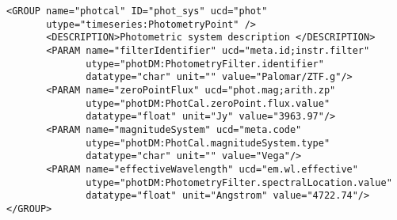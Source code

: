 \noindent
\begingroup\footnotesize
\begin{tcolorbox}
\begin{verbatim}
<GROUP name="photcal" ID="phot_sys" ucd="phot" 
       utype="timeseries:PhotometryPoint" /> 
       <DESCRIPTION>Photometric system description </DESCRIPTION>
       <PARAM name="filterIdentifier" ucd="meta.id;instr.filter" 
              utype="photDM:PhotometryFilter.identifier" 
              datatype="char" unit="" value="Palomar/ZTF.g"/>
       <PARAM name="zeroPointFlux" ucd="phot.mag;arith.zp" 
              utype="photDM:PhotCal.zeroPoint.flux.value" 
              datatype="float" unit="Jy" value="3963.97"/>
       <PARAM name="magnitudeSystem" ucd="meta.code" 
              utype="photDM:PhotCal.magnitudeSystem.type" 
              datatype="char" unit="" value="Vega"/>
       <PARAM name="effectiveWavelength" ucd="em.wl.effective" 
              utype="photDM:PhotometryFilter.spectralLocation.value" 
              datatype="float" unit="Angstrom" value="4722.74"/>
</GROUP>
\end{verbatim}
\end{tcolorbox}
\endgroup
